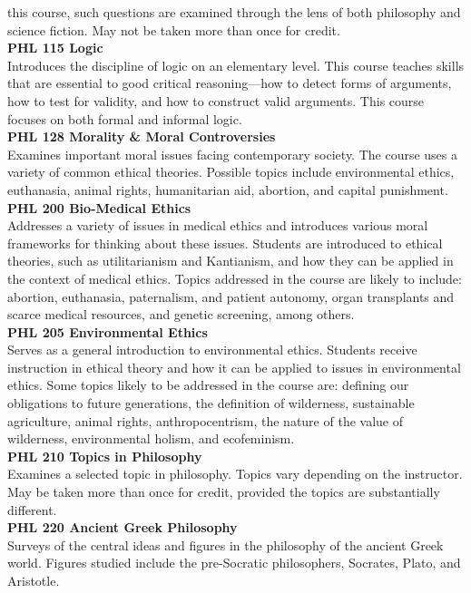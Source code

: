 \documentclass[
  letterpaper,
]{scrbook}
\begin{document}
this course, such questions are examined through the lens of both
philosophy and science fiction. May not be taken more than once for
credit.\\
\textbf{PHL 115 Logic}\\
Introduces the discipline of logic on an elementary level. This course
teaches skills that are essential to good critical reasoning---how to
detect forms of arguments, how to test for validity, and how to
construct valid arguments. This course focuses on both formal and
informal logic.\\
\textbf{PHL 128 Morality \& Moral Controversies}\\
Examines important moral issues facing contemporary society. The course
uses a variety of common ethical theories. Possible topics include
environmental ethics, euthanasia, animal rights, humanitarian aid,
abortion, and capital punishment.\\
\textbf{PHL 200 Bio-Medical Ethics}\\
Addresses a variety of issues in medical ethics and introduces various
moral frameworks for thinking about these issues. Students are
introduced to ethical theories, such as utilitarianism and Kantianism,
and how they can be applied in the context of medical ethics. Topics
addressed in the course are likely to include: abortion, euthanasia,
paternalism, and patient autonomy, organ transplants and scarce medical
resources, and genetic screening, among others.\\
\textbf{PHL 205 Environmental Ethics}\\
Serves as a general introduction to environmental ethics. Students
receive instruction in ethical theory and how it can be applied to
issues in environmental ethics. Some topics likely to be addressed in
the course are: defining our obligations to future generations, the
definition of wilderness, sustainable agriculture, animal rights,
anthropocentrism, the nature of the value of wilderness, environmental
holism, and ecofeminism.\\
\textbf{PHL 210 Topics in Philosophy}\\
Examines a selected topic in philosophy. Topics vary depending on the
instructor. May be taken more than once for credit, provided the topics
are substantially different.\\
\textbf{PHL 220 Ancient Greek Philosophy}\\
Surveys of the central ideas and figures in the philosophy of the
ancient Greek world. Figures studied include the pre-Socratic
philosophers, Socrates, Plato, and Aristotle.\\
\end{document}
